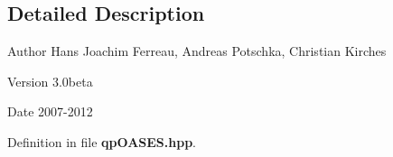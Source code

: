 \subsection{Detailed Description}
\begin{DoxyAuthor}{Author}
Hans Joachim Ferreau, Andreas Potschka, Christian Kirches 
\end{DoxyAuthor}
\begin{DoxyVersion}{Version}
3.0beta 
\end{DoxyVersion}
\begin{DoxyDate}{Date}
2007-\/2012 
\end{DoxyDate}


Definition in file {\bf qpOASES.hpp}.

